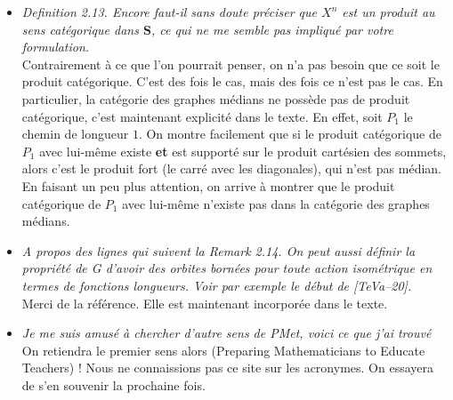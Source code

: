 \documentclass[a4paper]{article}
\theoremstyle{definition}
\begin{document}
\begin{itemize}
\item
\textit{Definition 2.13. Encore faut-il sans doute préciser que $X^n$ est un produit au sens catégorique dans $\mathbf S$, ce qui ne me semble pas impliqué par votre formulation.}\\
Contrairement à ce que l'on pourrait penser, on n'a pas besoin que ce soit le produit catégorique. C'est des fois le cas, mais des fois ce n'est pas le cas. En particulier, la catégorie des graphes médians ne possède pas de produit catégorique, c'est maintenant explicité dans le texte.
En effet, soit $P_1$ le chemin de longueur $1$. On montre facilement que si le produit catégorique de $P_1$ avec lui-même existe \textbf{et} est supporté sur le produit cartésien des sommets, alors c'est le produit fort (le carré avec les diagonales), qui n'est pas médian. En faisant un peu plus attention, on arrive à montrer que le produit catégorique de $P_1$ avec lui-même n'existe pas dans la catégorie des graphes médians.
\item
\textit{A propos des lignes qui suivent la Remark 2.14. On peut aussi définir la propriété de G d’avoir des orbites bornées pour toute action isométrique en termes de fonctions longueurs. Voir par exemple le début de [TeVa–20].}\\
Merci de la référence. Elle est maintenant incorporée dans le texte.
\item\textit{Je me suis amusé à chercher d’autre sens de PMet, voici ce que j’ai trouvé}\\
On retiendra le premier sens alors (Preparing Mathematicians to Educate Teachers) ! Nous ne connaissions pas ce site sur les acronymes. On essayera de s'en souvenir la prochaine fois.
\end{itemize}
%
%
%


%
%
%
%
%
%
%
%
%
%
\end{document}
